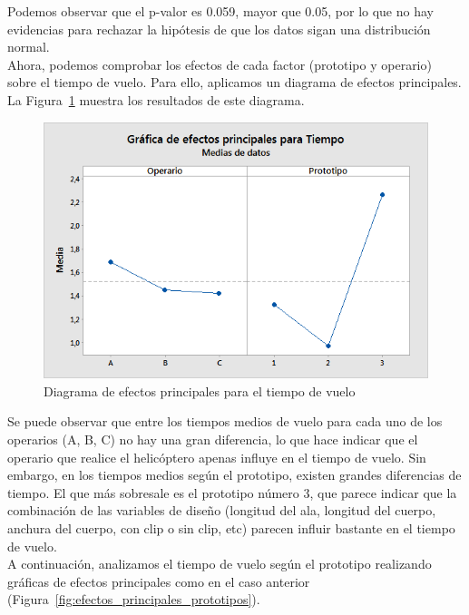 \documentclass[12pt,a4paper,twoside,openright,titlepage,final]{article}
\begin{document}
Podemos observar que el p-valor es 0.059, mayor que 0.05, por lo que no hay evidencias para rechazar la hipótesis de que los datos sigan una distribución normal.\\

Ahora, podemos comprobar los efectos de cada factor (prototipo y operario) sobre el tiempo de vuelo. Para ello, aplicamos un diagrama de efectos principales. La Figura~\ref{fig:efectos_principales} muestra los resultados de este diagrama.\\

\begin{figure}[htbp!]
	\centering
	\includegraphics[width=0.7\linewidth]{imagenes/Grafica_de_efectos_principales_para_Tiempo}
	\caption{Diagrama de efectos principales para el tiempo de vuelo}
	\label{fig:efectos_principales}
\end{figure}

Se puede observar que entre los tiempos medios de vuelo para cada uno de los operarios (A, B, C) no hay una gran diferencia, lo que hace indicar que el operario que realice el helicóptero apenas influye en el tiempo de vuelo. Sin embargo, en los tiempos medios según el prototipo, existen grandes diferencias de tiempo. El que más sobresale es el prototipo número 3, que parece indicar que la combinación de las variables de diseño (longitud del ala, longitud del cuerpo, anchura del cuerpo, con clip o sin clip, etc) parecen influir bastante en el tiempo de vuelo.\\

A continuación, analizamos el tiempo de vuelo según el prototipo realizando gráficas de efectos principales como en el caso anterior (Figura~\ref{fig:efectos_principales_prototipos}).
\end{document}
